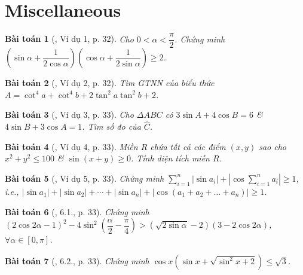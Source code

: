 \documentclass{article}
\newtheorem{baitoan}{Bài toán}
\begin{document}

\section{Miscellaneous}

\begin{baitoan}[\cite{Hung_nang_cao_phat_trien_Toan_11_tap_1}, Ví dụ 1, p. 32]
	Cho $0 < \alpha < \dfrac{\pi}{2}$. Chứng minh $\left(\sin\alpha + \dfrac{1}{2\cos\alpha}\right)\left(\cos\alpha + \dfrac{1}{2\sin\alpha}\right)\ge2$.
\end{baitoan}

\begin{baitoan}[\cite{Hung_nang_cao_phat_trien_Toan_11_tap_1}, Ví dụ 2, p. 32]
	Tìm {\rm GTNN} của biểu thức $A = \cot^4a + \cot^4b + 2\tan^2a\tan^2b + 2$.
\end{baitoan}

\begin{baitoan}[\cite{Hung_nang_cao_phat_trien_Toan_11_tap_1}, Ví dụ 3, p. 33]
	Cho $\Delta ABC$ có $3\sin A + 4\cos B = 6$ \& $4\sin B + 3\cos A = 1$. Tìm số đo của $\widehat{C}$.
\end{baitoan}

\begin{baitoan}[\cite{Hung_nang_cao_phat_trien_Toan_11_tap_1}, Ví dụ 4, p. 33]
	Miền $R$ chứa tất cả các điểm $(x,y)$ sao cho $x^2 + y^2\le100$ \& $\sin(x + y)\ge0$. Tính diện tích miền $R$.
\end{baitoan}

\begin{baitoan}[\cite{Hung_nang_cao_phat_trien_Toan_11_tap_1}, Ví dụ 5, p. 33]
	Chứng minh $\sum_{i=1}^n |\sin a_i| + |\cos\sum_{i=1}^n a_i|\ge1$, i.e., $|\sin a_1| + |\sin a_2| + \cdots + |\sin a_n| + |\cos(a_1 + a_2 + \ldots + a_n)|\ge1$.
\end{baitoan}

\begin{baitoan}[\cite{Hung_nang_cao_phat_trien_Toan_11_tap_1}, 6.1., p. 33]
	Chứng minh $(2\cos2\alpha - 1)^2 - 4\sin^2\left(\dfrac{\alpha}{2} - \dfrac{\pi}{4}\right) > (\sqrt{2\sin\alpha} - 2)(3 - 2\cos2\alpha)$, $\forall\alpha\in[0,\pi]$.
\end{baitoan}

\begin{baitoan}[\cite{Hung_nang_cao_phat_trien_Toan_11_tap_1}, 6.2., p. 33]
	Chứng minh $\cos x(\sin x + \sqrt{\sin^2x + 2})\le\sqrt{3}$.
\end{baitoan}
\end{document}
